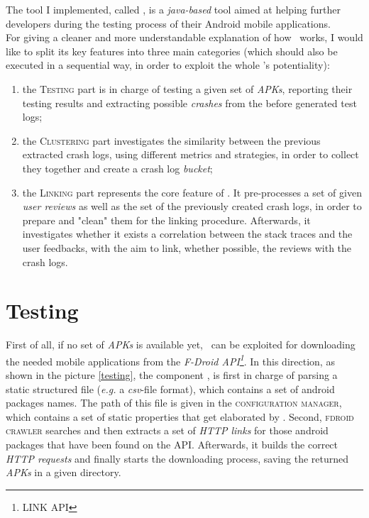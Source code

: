 The tool I implemented, called \toolname, is a \textit{java-based} tool aimed at helping further developers during the testing process of their Android mobile applications. \\
For giving a cleaner and more understandable explanation of how \toolname\ works, I would like to split its key features into three main categories (which should also be executed in a sequential way, in order to exploit the whole \toolname's potentiality): 
\begin{enumerate}
\item the \textsc{Testing} part is in charge of testing a given set of \textit{APKs}, reporting their testing results and extracting possible \textit{crashes} from the before generated test logs; 

\item the \textsc{Clustering} part investigates the similarity between the previous extracted crash logs, using different metrics and strategies, in order to collect they together and create a crash log \textit{bucket}; 

\item the \textsc{Linking} part represents the core feature of \toolname. It pre-processes a set of given \textit{user reviews} as well as the set of the previously created crash logs, in order to prepare and "clean" them for the linking procedure.  Afterwards, it investigates whether it exists a correlation between the stack traces and the user feedbacks, with the aim to link, whether possible, the reviews with the crash logs. 
\end{enumerate}

\section{Testing}
First of all, if no set of \textit{APKs} is available yet, \toolname\ can be exploited for downloading the needed mobile applications from the \textit{F-Droid API\footnote{LINK API}}. In this direction, as shown in the picture \ref{testing}, the component \FDroidCrawler, is first in charge of  parsing a static structured file (\textit{e.g.} a \textit{csv}-file format), which contains a set of android packages names. 
The path of this file is given in the \textsc{configuration manager}, which contains a set of static properties that get elaborated by \toolname. Second, \textsc{fdroid crawler} searches and then extracts a set of \textit{HTTP links} for those android packages that have been found on the API. Afterwards, it builds the correct \textit{HTTP requests} and finally starts the downloading process, saving the returned \textit{APKs} in a given directory.

